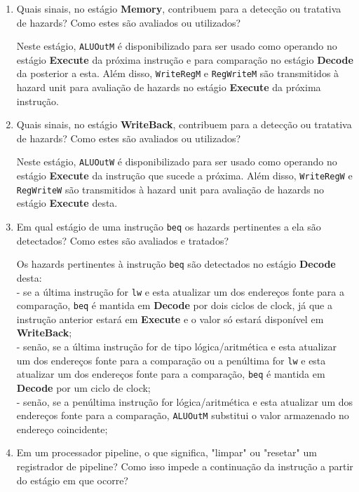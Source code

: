 \documentclass{article}
\begin{document}
\begin{enumerate}
\item Quais sinais, no estágio \textbf{Memory}, contribuem para a detecção ou tratativa de hazards? Como estes são avaliados ou utilizados?

\noindent Neste estágio, \verb|ALUOutM| é disponibilizado para ser usado como operando no estágio \textbf{Execute} da próxima instrução e para comparação no estágio \textbf{Decode} da posterior a esta. Além disso, \verb|WriteRegM| e \verb|RegWriteM| são transmitidos à hazard unit para avaliação de hazards no estágio \textbf{Execute} da próxima instrução.
\bigbreak

\item Quais sinais, no estágio \textbf{WriteBack}, contribuem para a detecção ou tratativa de hazards? Como estes são avaliados ou utilizados?

\noindent Neste estágio, \verb|ALUOutW| é disponibilizado para ser usado como operando no estágio \textbf{Execute} da instrução que sucede a próxima. Além disso, \verb|WriteRegW| e \verb|RegWriteW| são transmitidos à hazard unit para avaliação de hazards no estágio \textbf{Execute} desta.
\bigbreak

\item Em qual estágio de uma instrução \verb|beq| os hazards pertinentes a ela são detectados? Como estes são avaliados e tratados?

\noindent Os hazards pertinentes à instrução \verb|beq| são detectados no estágio \textbf{Decode} desta:\\
- se a última instrução for \verb|lw| e esta atualizar um dos endereços fonte para a comparação, \verb|beq| é mantida em \textbf{Decode} por dois ciclos de clock, já que a instrução anterior estará em \textbf{Execute} e o valor só estará disponível em \textbf{WriteBack};\\
- senão, se a última instrução for de tipo lógica/aritmética e esta atualizar um dos endereços fonte para a comparação ou a penúltima for \verb|lw| e esta atualizar um dos endereços fonte para a comparação, \verb|beq| é mantida em \textbf{Decode} por um ciclo de clock;\\
- senão, se a penúltima instrução for lógica/aritmética e esta atualizar um dos endereços fonte para a comparação, \verb|ALUOutM| substitui o valor armazenado no endereço coincidente;
\bigbreak

\item Em um processador pipeline, o que significa, "limpar" ou "resetar" um registrador de pipeline? Como isso impede a continuação da instrução a partir do estágio em que ocorre?


\end{enumerate}
\end{document}
